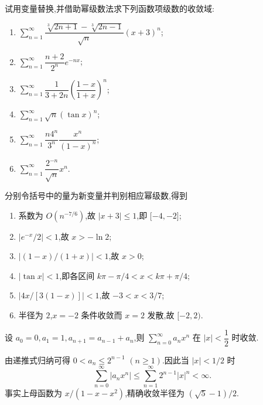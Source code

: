 \begin{example}
    试用变量替换,并借助幂级数法求下列函数项级数的收敛域:
    \begin{enumerate}
        \item $\displaystyle\sum\limits_{n=1}^{\infty}\dfrac{\sqrt[3]{2n+1}-\sqrt[3]{2n-1}}{\sqrt n}(x+3)^n$;
        \item $\displaystyle\sum\limits_{n=1}^{\infty}\dfrac{n+2}{2^n}e^{-nx}$;
        \item $\displaystyle\sum\limits_{n=1}^{\infty}\dfrac{1}{3+2n}\left(\dfrac{1-x}{1+x}\right)^n$;
        \item $\displaystyle\sum\limits_{n=1}^{\infty}\sqrt n(\tan x)^n$;
        \item $\displaystyle\sum\limits_{n=1}^{\infty}\dfrac{n4^n}{3^n}\dfrac{x^n}{(1-x)^n}$;
        \item $\displaystyle\sum\limits_{n=1}^{\infty}\dfrac{2^{-n}}{\sqrt n}x^n$.
    \end{enumerate}
\end{example}
\exampleblank

\begin{solution}
    分别令括号中的量为新变量并判别相应幂级数,得到
    \begin{enumerate}
        \item 系数为 $O(n^{-7/6})$,故 $|x+3|\leq1$,即 $\lbrack-4,-2\rbrack$;
        \item $|e^{-x}/2|<1$,故 $x>-\ln2$;
        \item $|(1-x)/(1+x)|<1$,故 $x>0$;
        \item $|\tan x|<1$,即各区间 $k\pi-\pi/4<x<k\pi+\pi/4$;
        \item $|4x/[3(1-x)]|<1$,故 $-3<x<3/7$;
        \item 半径为 $2$,$x=-2$ 条件收敛而 $x=2$ 发散,故 $\lbrack-2,2)$.
    \end{enumerate}
\end{solution}

\begin{example}
    设 $a_0=0,a_1=1,a_{n+1}=a_{n-1}+a_n$,则 $\displaystyle\sum\limits_{n=0}^{\infty}a_nx^n$ 在 $|x|<\dfrac{1}{2}$ 时收敛.
\end{example}
\exampleblank

\begin{solution}
    由递推式归纳可得 $0<a_n\leq2^{n-1}$ $(n\geq1)$.因此当 $|x|<1/2$ 时
    \[
        \displaystyle\sum\limits_{n=0}^{\infty}|a_nx^n|
        \leq\sum\limits_{n=1}^{\infty}2^{n-1}|x|^n<\infty.
    \]
    事实上母函数为 $x/(1-x-x^2)$,精确收敛半径为 $(\sqrt5-1)/2$.
\end{solution}

